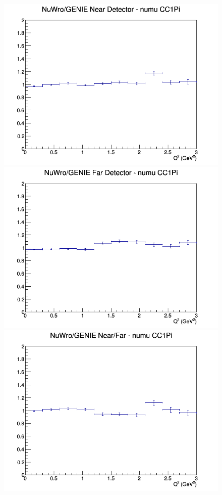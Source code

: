 \begin{figure}[h]
\endminipage
\newline
{}
\includegraphics[width=\linewidth]{eff_Q2/LAr/ratios/CC1Pi_NuWro_GENIE_numu_near_Q2.png}
\endminipage
{}
\includegraphics[width=\linewidth]{eff_Q2/LAr/ratios/CC1Pi_NuWro_GENIE_numu_far_Q2.png}
\endminipage
{}
\includegraphics[width=\linewidth]{eff_Q2/LAr/ratios/CC1Pi_NuWro_GENIE_numu_NF_Q2.png}
\endminipage
\newline
\end{figure}
\clearpage
